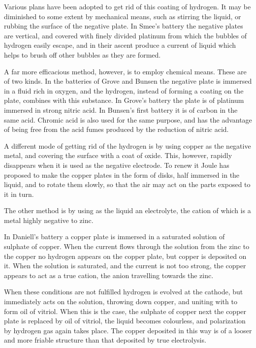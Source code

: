 \documentclass[12pt,oneside]{book}[2021/10/04]
\newcommand{\¬}{\hphantom{0}}
\begin{document}
Various plans have been adopted to get rid of this coating of
hydrogen. It may be diminished to some extent by mechanical
means, such as stirring the liquid, or rubbing the surface of the
negative plate. In Smee's battery the negative plates are vertical,
and covered with finely divided platinum from which the
bubbles of hydrogen easily escape, and in their ascent produce a
current of liquid which helps to brush off other bubbles as they
are formed.

A far more efficacious method, however, is to employ chemical
means. These are of two kinds. In the batteries of Grove and
Bunsen the negative plate is immersed in a fluid rich in oxygen,
and the hydrogen, instead of forming a coating on the plate,
combines with this substance. In Grove's battery the plate is
of platinum immersed in strong nitric acid. In Bunsen's first
battery it is of carbon in the same acid. Chromic acid is also used
for the same purpose, and has the advantage of being free from the
acid fumes produced by the reduction of nitric acid.

A different mode of getting rid of the hydrogen is by using
copper as the negative metal, and covering the surface with a coat
of oxide. This, however, rapidly disappears when it is used as
the negative electrode. To renew it Joule has proposed to make
the copper plates in the form of disks, half immersed in the liquid,
and to rotate them slowly, so that the air may act on the parts
exposed to it in turn.

The other method is by using as the liquid an electrolyte, the
cation of which is a metal highly negative to zinc.

In Daniell's battery a copper plate is immersed in a saturated
solution of sulphate of copper. When the current flows through
the solution from the zinc to the copper no hydrogen appears on
the copper plate, but copper is deposited on it. When the solution
is saturated, and the current is not too strong, the copper appears
to act as a true cation, the anion  travelling towards the zinc.

When these conditions are not fulfilled hydrogen is evolved at
the cathode, but immediately acts on the solution, throwing down
copper, and uniting with  to form oil of vitriol. When this
is the case, the sulphate of copper next the copper plate is replaced
by oil of vitriol, the liquid becomes colourless, and polarization by
hydrogen gas again takes place. The copper deposited in this way
is of a looser and more friable structure than that deposited by true
electrolysis.
\end{document}
